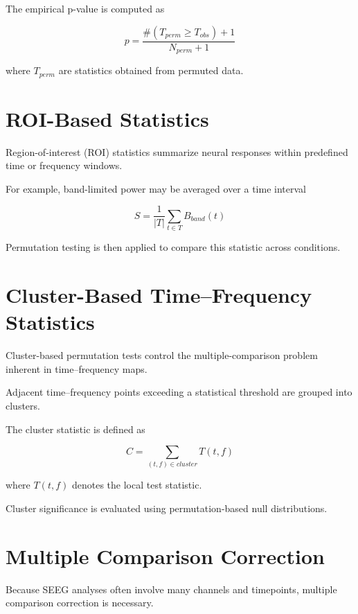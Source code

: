 \documentclass[11pt]{report}
\begin{document}
The empirical p-value is computed as

\begin{equation}
p =
\frac{\#(T_{perm} \ge T_{obs}) + 1}{N_{perm} + 1}
\end{equation}

where $T_{perm}$ are statistics obtained from permuted data.

\section{ROI-Based Statistics}

Region-of-interest (ROI) statistics summarize neural responses within
predefined time or frequency windows.

For example, band-limited power may be averaged over a time interval

\begin{equation}
S =
\frac{1}{|T|}
\sum_{t \in T} B_{band}(t)
\end{equation}

Permutation testing is then applied to compare this statistic across
conditions.

\section{Cluster-Based Time--Frequency Statistics}

Cluster-based permutation tests control the multiple-comparison
problem inherent in time--frequency maps.

Adjacent time--frequency points exceeding a statistical threshold
are grouped into clusters.

The cluster statistic is defined as

\begin{equation}
C =
\sum_{(t,f) \in cluster} T(t,f)
\end{equation}

where $T(t,f)$ denotes the local test statistic.

Cluster significance is evaluated using permutation-based null
distributions.

\section{Multiple Comparison Correction}

Because SEEG analyses often involve many channels and timepoints,
multiple comparison correction is necessary.
\end{document}
